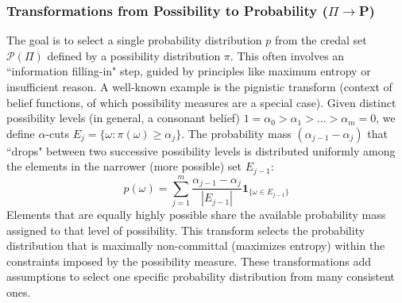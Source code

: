 \subsubsection{Transformations from Possibility to Probability ($\Pi\to$P)}
The goal is to select a single probability distribution $p$ from the credal set $\mathcal{P}(\Pi)$ defined by a possibility distribution $\pi$. This often involves an ``information filling-in" step, guided by principles like maximum entropy or insufficient reason.
A well-known example is the pignistic transform (context of belief functions, of which possibility measures are a special case). Given distinct possibility levels (in general, a consonant belief) $1 = \alpha_0 > \alpha_1 > \dots > \alpha_m = 0$, we define $\alpha$-cuts $E_j = \{\omega : \pi(\omega) \ge \alpha_j\}$. The probability mass $(\alpha_{j-1} - \alpha_j)$ that ``drops" between two successive possibility levels is distributed uniformly among the elements in the narrower (more possible) set $E_{j-1}$:
\[ p(\omega) = \sum_{j=1}^{m} \frac{\alpha_{j-1} - \alpha_j}{|E_{j-1}|} \mathbf{1}_{\{\omega \in E_{j-1}\}} \]
Elements that are equally highly possible share the available probability mass assigned to that level of possibility. This transform selects the probability distribution that is maximally non-committal (maximizes entropy) within the constraints imposed by the possibility measure. These transformations add assumptions to select one specific probability distribution from many consistent ones.

